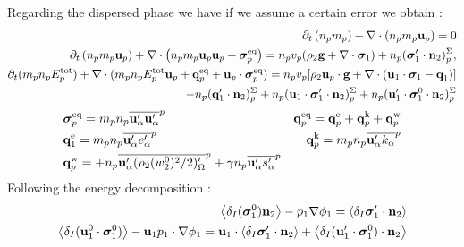 Regarding the dispersed phase we have  if we assume a certain error we obtain :
\begin{align*}
    \partial_t \left(n_p m_p\right)
    + \mathbf{\nabla}\cdot \left(n_pm_p\textbf{u}_p
    \right)
    = 
    0\\
    \partial_t \left(n_p m_p \textbf{u}_p\right)
    + \mathbf{\nabla}\cdot \left(n_p
    m_p \textbf{u}_p \textbf{u}_p 
    + \bm{\sigma}_p^\text{eq}
    \right)
    = 
    n_p v_p (\rho_2 \textbf{g}
    + \mathbf{\nabla}\cdot \bm{\sigma}_1)
    + n_p (\bm{\sigma}_1' \cdot \textbf{n}_2)_p^\Sigma,\\
    \partial_t(m_p n_pE_p^\text{tot})
    + \mathbf{\nabla}\cdot(m_pn_p E_p^\text{tot} \textbf{u}_p 
    + \textbf{q}_p^\text{eq} 
    + \textbf{u}_p \cdot \bm{\sigma}_p^\text{eq})
    =  n_p v_p [\rho_2 \textbf{u}_p\cdot  \textbf{g}
    + \mathbf{\nabla}\cdot (\textbf{u}_1 \cdot \bm{\sigma}_1 - \textbf{q}_1)]\\
    -  n_p (\textbf{q}_1' \cdot \textbf{n}_2)_p^\Sigma
    +  n_p (\textbf{u}_1 \cdot \bm{\sigma}_1' \cdot \textbf{n}_2)_p^\Sigma
    +  n_p (\textbf{u}_1' \cdot \bm{\sigma}_1^0\cdot \textbf{n}_2)_p^\Sigma
\end{align*}
\begin{align*}
    &\bm{\sigma}_p^\text{eq}
    = m_pn_p\overline{\textbf{u}_\alpha'\textbf{u}_\alpha'}^{p}
    &\textbf{q}_p^\text{eq}
    =\textbf{q}_p^\text{e} 
    +\textbf{q}_p^\text{k}  
    +\textbf{q}_p^\text{w}  
    \\
    &\textbf{q}_1^\text{e}
    = m_p n_p\overline{\textbf{u}_\alpha' e_\alpha'}^{p} 
    &\textbf{q}_p^\text{k}
    = m_p n_p\overline{\textbf{u}_\alpha' k_\alpha}^{p} 
    \\
    &\textbf{q}_p^\text{w}
    = 
    + n_p\overline{\textbf{u}_\alpha'(\rho_2 (w^0_2)^2/2 )'_\Omega}^{p}
    + \gamma n_p\overline{\textbf{u}_\alpha' s_\alpha'}^{p}
\end{align*}
Following the energy decomposition : 
\begin{align*}
    \left<\delta_I (\bm{\sigma}_1^0 ) \textbf{n}_2\right> - p_1 \mathbf{\nabla} \phi_1
    = 
    \left<\delta_I \bm{\sigma}_1'\cdot \textbf{n}_2\right>
    \\
    \left<\delta_I (\textbf{u}_1^0 \cdot\bm{\sigma}_1^0 )\right> - \textbf{u}_1p_1\cdot \mathbf{\nabla} \phi_1
    = \textbf{u}_1 \cdot \left<\delta_I \bm{\sigma}_1'\cdot \textbf{n}_2\right>
    + \left<\delta_I (\textbf{u}_1' \cdot \bm{\sigma}_1^0 )\cdot \textbf{n}_2\right>
\end{align*}
